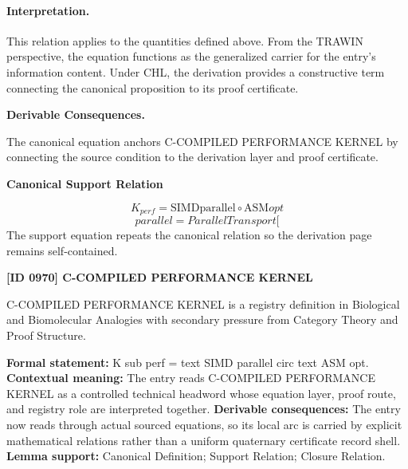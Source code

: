 \paragraph{Interpretation.}
This relation applies to the quantities defined above. From the TRAWIN perspective, the equation functions as the generalized carrier for the entry’s information content. Under CHL, the derivation provides a constructive term connecting the canonical proposition to its proof certificate.

\par\vspace{0.35em}
\noindent\textbf{Derivable Consequences.}\quad
\begingroup
\footnotesize
\raggedright
The canonical equation anchors C-COMPILED PERFORMANCE KERNEL by connecting the source condition to the derivation layer and proof certificate.
\par\endgroup

\noindent\textbf{Canonical Support Relation}\par
\[
K_{perf} = \text{SIMD} {\mathrm{parallel}} \circ \text{ASM} {opt}
\]
\[
parallel = ParallelTransport[
\]
\noindent The support equation repeats the canonical relation so the derivation page remains self-contained.\par

\clearpage
\noindent\textbf{[ID 0970] C-COMPILED PERFORMANCE KERNEL}\par
\vspace{0.35em}
\begingroup\small
{}
C-COMPILED PERFORMANCE KERNEL is a registry definition in Biological and Biomolecular Analogies with secondary pressure from Category Theory and Proof Structure.

\begingroup\footnotesize\setlength{\emergencystretch}{3em}\sloppy
\textbf{Formal statement:} K sub perf = text SIMD parallel circ text ASM opt. \textbf{Contextual meaning:} The entry reads C-COMPILED PERFORMANCE KERNEL as a controlled technical headword whose equation layer, proof route, and registry role are interpreted together. \textbf{Derivable consequences:} The entry now reads through actual sourced equations, so its local arc is carried by explicit mathematical relations rather than a uniform quaternary certificate record shell. \textbf{Lemma support:} Canonical Definition; Support Relation; Closure Relation.\par
\endgroup

